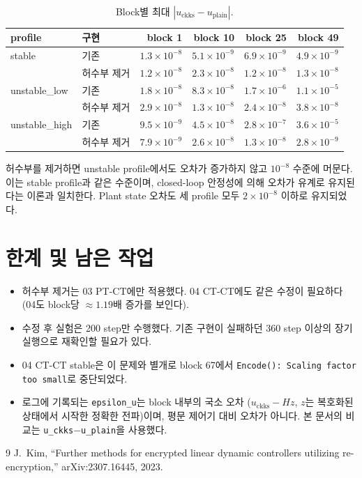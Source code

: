 \documentclass[11pt,a4paper]{article}
\begin{document}
\begin{table}[h]
\centering
\begin{tabular}{llrrrr}
\toprule
profile & 구현 & block 1 & block 10 & block 25 & block 49 \\
\midrule
stable        & 기존        & $1.3\times10^{-8}$ & $5.1\times10^{-9}$ & $6.9\times10^{-9}$ & $4.9\times10^{-9}$ \\
              & 허수부 제거 & $1.2\times10^{-8}$ & $2.3\times10^{-8}$ & $1.2\times10^{-8}$ & $1.3\times10^{-8}$ \\
unstable\_low  & 기존        & $1.8\times10^{-8}$ & $8.3\times10^{-8}$ & $1.7\times10^{-6}$ & $1.1\times10^{-5}$ \\
              & 허수부 제거 & $2.9\times10^{-8}$ & $1.3\times10^{-8}$ & $2.4\times10^{-8}$ & $3.8\times10^{-8}$ \\
unstable\_high & 기존        & $9.5\times10^{-9}$ & $4.5\times10^{-8}$ & $2.8\times10^{-7}$ & $3.6\times10^{-5}$ \\
              & 허수부 제거 & $7.9\times10^{-9}$ & $2.6\times10^{-8}$ & $1.3\times10^{-8}$ & $2.8\times10^{-9}$ \\
\bottomrule
\end{tabular}
\caption{Block별 최대 $|u_{\mathrm{ckks}}-u_{\mathrm{plain}}|$.}
\label{tab:fix}
\end{table}

허수부를 제거하면 unstable profile에서도 오차가 증가하지 않고 $10^{-8}$ 수준에 머문다.
이는 stable profile과 같은 수준이며, closed-loop 안정성에 의해 오차가 유계로 유지된다는 이론과 일치한다.
Plant state 오차도 세 profile 모두 $2\times10^{-8}$ 이하로 유지되었다.

\section{한계 및 남은 작업}
\begin{itemize}
\item 허수부 제거는 03 PT-CT에만 적용했다. 04 CT-CT에도 같은 수정이 필요하다 (04도 block당 $\approx1.19$배 증가를 보인다).
\item 수정 후 실험은 200 step만 수행했다. 기존 구현이 실패하던 360 step 이상의 장기 실행으로 재확인할 필요가 있다.
\item 04 CT-CT stable은 이 문제와 별개로 block 67에서 \texttt{Encode(): Scaling factor too small}로 중단되었다.
\item 로그에 기록되는 \texttt{epsilon\_u}는 block 내부의 국소 오차 ($u_{\mathrm{ckks}}-H z$, $z$는 복호화된 상태에서 시작한 정확한 전파)이며, 평문 제어기 대비 오차가 아니다. 본 문서의 비교는 \texttt{u\_ckks}$-$\texttt{u\_plain}을 사용했다.
\end{itemize}

\begin{thebibliography}{9}
 J.~Kim, ``Further methods for encrypted linear dynamic controllers utilizing re-encryption,'' arXiv:2307.16445, 2023.
\end{thebibliography}
\end{document}
